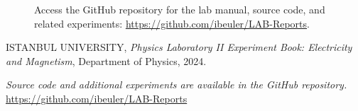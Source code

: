 \documentclass[journal]{IEEEtran}
\begin{document}
\begin{figure}[H]
    \centering
    \begin{minipage}{0.15\textwidth}
        \centering
    \end{minipage}%
    \begin{minipage}{0.2\textwidth}
        \raggedright
        \caption{Access the GitHub repository for the lab manual, source code, and related experiments: \href{https://github.com/ibeuler/LAB-Reports}{\url{https://github.com/ibeuler/LAB-Reports}}.}
        \label{fig:qr_code}
    \end{minipage}
\end{figure}

\begin{thebibliography}{9}
    ISTANBUL UNIVERSITY, \textit{Physics Laboratory II Experiment Book: Electricity and Magnetism}, Department of Physics, 2024.

    \textit{Source code and additional experiments are available in the GitHub repository.} \url{https://github.com/ibeuler/LAB-Reports}
\end{thebibliography}
\end{document}

